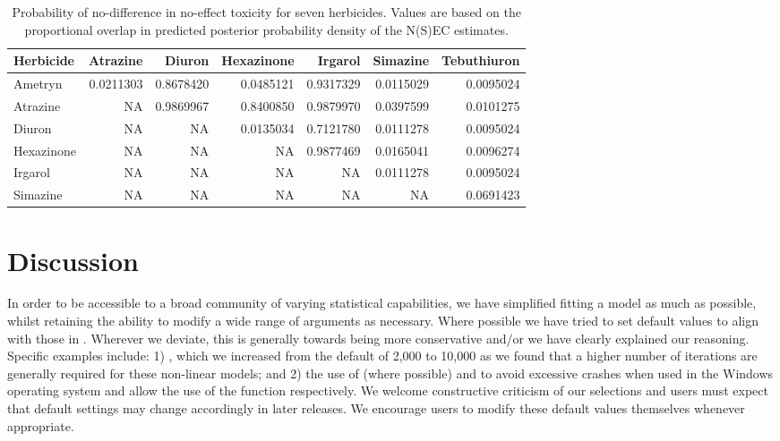 \documentclass[
  shortnames]{jss}
\begin{document}
\begin{CodeChunk}
\begin{table}

\caption{\label{tab:probdiffs}Probability of no-difference in no-effect toxicity for seven herbicides. Values are based on the proportional overlap in predicted posterior probability density of the N(S)EC estimates.}
\centering
\begin{tabular}[t]{l|r|r|r|r|r|r}
\hline
Herbicide & Atrazine & Diuron & Hexazinone & Irgarol & Simazine & Tebuthiuron\\
\hline
Ametryn & 0.0211303 & 0.8678420 & 0.0485121 & 0.9317329 & 0.0115029 & 0.0095024\\
\hline
Atrazine & NA & 0.9869967 & 0.8400850 & 0.9879970 & 0.0397599 & 0.0101275\\
\hline
Diuron & NA & NA & 0.0135034 & 0.7121780 & 0.0111278 & 0.0095024\\
\hline
Hexazinone & NA & NA & NA & 0.9877469 & 0.0165041 & 0.0096274\\
\hline
Irgarol & NA & NA & NA & NA & 0.0111278 & 0.0095024\\
\hline
Simazine & NA & NA & NA & NA & NA & 0.0691423\\
\hline
\end{tabular}
\end{table}

\end{CodeChunk}

\hypertarget{discussion}{%
\section{Discussion}\label{discussion}}

In order to be accessible to a broad community of varying statistical capabilities, we have simplified fitting a  model as much as possible, whilst retaining the ability to modify a wide range of arguments as necessary. Where possible we have tried to set default values to align with those in . Wherever we deviate, this is generally towards being more conservative and/or we have clearly explained our reasoning. Specific examples include: 1) , which we increased from the  default of 2,000 to 10,000 as we found that a higher number of iterations are generally required for these non-linear models; and 2) the use of  (where possible) and  to avoid excessive  crashes when used in the Windows operating system and allow the use of the  function respectively. We welcome constructive criticism of our selections and users must expect that default settings may change accordingly in later releases. We encourage users to modify these default values themselves whenever appropriate.
\end{document}
